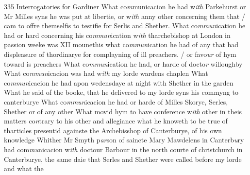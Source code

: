 \documentclass[12pt, a4paper]{book}
\begin{document}
{\color{Mahogany}335} Interrogatories for Gardiner  
				\marginpar[\vspace{0.5cm}{\textcolor{Gray}{1}}]{}
			 What co\textit{m}municacion he had w\textit{ith }Parkehurst or Mr Milles syns he was put at libertie, or w\textit{ith} anny other concerning them that / cam to offre themselfis to testifie for Serlis and Shether.  
				\marginpar[\vspace{0.5cm}{\textcolor{Gray}{2}}]{}
			 What co\textit{mmun}ication he had or hard concerning his co\textit{mmun}ication w\textit{ith }tharchebishop  at London in passion weeke was XII mounethis  
				\marginpar[\vspace{0.5cm}{\textcolor{Gray}{3}}]{}
			 what co\textit{mmun}ication he had of any that had displeasure of thordinarye for complayning of ill preachers. / or favo\textit{ur} of hym toward is preachers  
				\marginpar[\vspace{0.5cm}{\textcolor{Gray}{4}}]{}
			 What co\textit{mmun}ication he had, or harde of docto\textit{r} willoughby  
				\marginpar[\vspace{0.5cm}{\textcolor{Gray}{5}}]{}
			 What co\textit{mmun}icacion was had w\textit{ith} my lorde wardens chaplen  
				\marginpar[\vspace{0.5cm}{\textcolor{Gray}{6}}]{}
			 What co\textit{mmun}icacion he had apon wedensdaye at night with Shether in the garden  
				\marginpar[\vspace{0.5cm}{\textcolor{Gray}{7}}]{}
			 What he said of the booke, that he delivered to my lorde syns his commyng to canterburye  
				\marginpar[\vspace{0.5cm}{\textcolor{Gray}{8}}]{}
			 What co\textit{mmun}icacion he had or harde of Milles Skorye, Serles, Shether or of any other  
				\marginpar[\vspace{0.5cm}{\textcolor{Gray}{9}}]{}
			 What movid hym to have conference w\textit{ith} other in theis matters co\textit{n}trary to his other and allegiance  
				\marginpar[\vspace{0.5cm}{\textcolor{Gray}{10}}]{}
			 what he knoweth to be true of tharticles presentid againste the  Archebisshop of Canterburye, of his own knowledge  
				\marginpar[\vspace{0.5cm}{\textcolor{Gray}{11}}]{}
			 Whither Mr Smyth p\textit{ar}son of saincte Mary Mawdelens in Canterb\textit{u}ry had com\textit{mu}nicacion w\textit{ith} doctour Barbour in the north courte of christchurch in Canterburye, the same daie that Serles and Shether were called  before my lorde and what the
\end{document}
